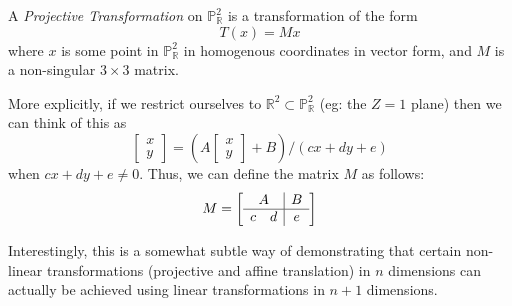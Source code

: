 \begin{mydef}
A \emph{Projective Transformation} on $\mathbb{P}^2_\mathbb{R}$ is a
transformation of the form
\[
T(x) = Mx
\]
where $x$ is some point in $\mathbb{P}^2_\mathbb{R}$ in homogenous coordinates in vector form,
and $M$ is a non-singular $3\times3$ matrix.
\end{mydef}

More explicitly, if we restrict ourselves to $\mathbb{R}^2 \subset \mathbb{P}^2_\mathbb{R}$
(eg: the $Z=1$ plane) then we can think of this as
\[
\begin{bmatrix}
x\\
y
\end{bmatrix} =
(A\begin{bmatrix}
x\\
y
\end{bmatrix} + B) / (cx+dy+e)
\]
when $cx+dy+e \ne 0$. Thus, we can define the matrix $M$ as follows:
\[
M= \left[\begin{array}{cc|c}
\multicolumn{2}{c|}{A} & B\\
\hline
c & d & e
\end{array}\right]
\]

Interestingly, this is a somewhat subtle way of demonstrating that certain
non-linear transformations (projective and affine translation) in $n$
dimensions can actually be achieved using linear transformations in $n+1$ dimensions.

